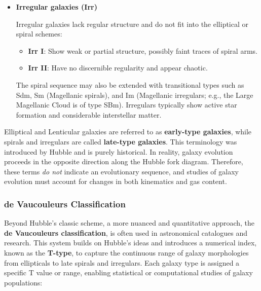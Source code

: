 \begin{itemize}
    \item \textbf{Irregular galaxies (Irr)} \par
    Irregular galaxies lack regular structure and do not fit into the elliptical or spiral schemes:
    \begin{itemize}
        \item \textbf{Irr I}: Show weak or partial structure, possibly faint traces of spiral arms.
        \item \textbf{Irr II}: Have no discernible regularity and appear chaotic.
    \end{itemize}
    The spiral sequence may also be extended with transitional types such as Sdm, Sm (Magellanic spirals), and Im (Magellanic irregulars; e.g., the Large Magellanic Cloud is of type SBm). Irregulars typically show active star formation and considerable interstellar matter.

\end{itemize}

\begin{tipsblock}
Elliptical and Lenticular galaxies are referred to as \textbf{early-type galaxies}, while spirals and irregulars are called \textbf{late-type galaxies}. This terminology was introduced by Hubble and is purely historical. In reality, galaxy evolution proceeds in the opposite direction along the Hubble fork diagram. Therefore, these terms \emph{do not} indicate an evolutionary sequence, and studies of galaxy evolution must account for changes in both kinematics and gas content.
\end{tipsblock}

\subsubsection{de Vaucouleurs Classification}

Beyond Hubble's classic scheme, a more nuanced and quantitative approach, the \textbf{de Vaucouleurs classification}, is often used in astronomical catalogues and research. This system builds on Hubble's ideas and introduces a numerical index, known as the \textbf{T-type}, to capture the continuous range of galaxy morphologies from ellipticals to late spirals and irregulars.
Each galaxy type is assigned a specific T value or range, enabling statistical or computational studies of galaxy populations:

\medskip

